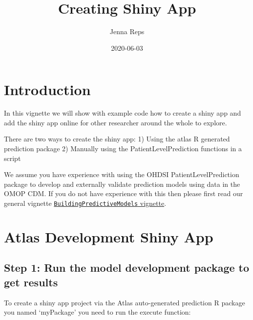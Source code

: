 \documentclass[
]{article}
\title{Creating Shiny App}
\author{Jenna Reps}
\date{2020-06-03}
\begin{document}
\maketitle

{
\setcounter{tocdepth}{2}
\tableofcontents
}
\hypertarget{introduction}{%
\section{Introduction}\label{introduction}}

In this vignette we will show with example code how to create a shiny
app and add the shiny app online for other researcher around the whole
to explore.

There are two ways to create the shiny app: 1) Using the atlas R
generated prediction package 2) Manually using the
PatientLevelPrediction functions in a script

We assume you have experience with using the OHDSI
PatientLevelPrediction package to develop and externally validate
prediction models using data in the OMOP CDM. If you do not have
experience with this then please first read our general vignette
\href{https://github.com/OHDSI/PatientLevelPrediction/blob/master/inst/doc/BuildingPredictiveModels.pdf}{\texttt{BuildingPredictiveModels}
vignette}.

\hypertarget{atlas-development-shiny-app}{%
\section{Atlas Development Shiny
App}\label{atlas-development-shiny-app}}

\hypertarget{step-1-run-the-model-development-package-to-get-results}{%
\subsection{Step 1: Run the model development package to get
results}\label{step-1-run-the-model-development-package-to-get-results}}

To create a shiny app project via the Atlas auto-generated prediction R
package you named `myPackage' you need to run the execute function:
\end{document}
